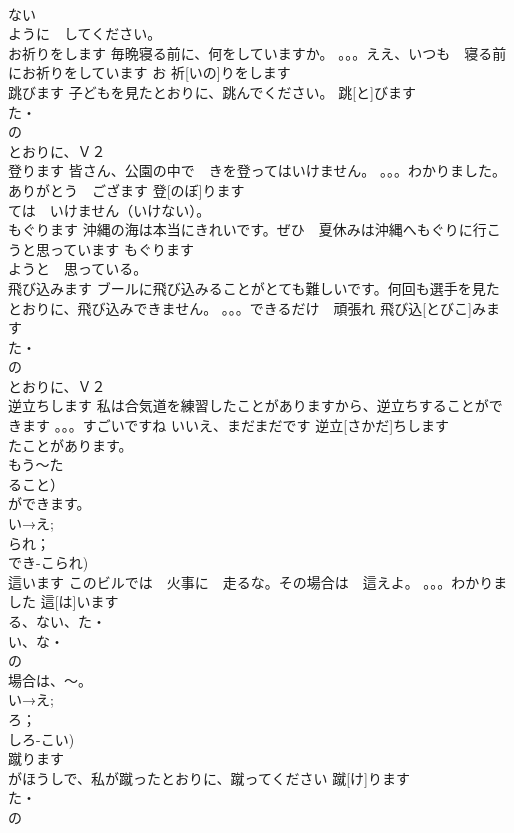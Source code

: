 \documentclass[8pt]{extreport}
\begin{document}
\begin{CJK}{UTF8}{min}
\\	ない
\\	ように　してください。
\\	お祈りをします	毎晩寝る前に、何をしていますか。 。。。ええ、いつも　寝る前にお祈りをしています	お 祈[いの]りをします			
\\	跳びます	子どもを見たとおりに、跳んでください。	跳[と]びます			
\\	た・
\\	の
\\	とおりに、Ｖ２
\\	登ります	皆さん、公園の中で　きを登ってはいけません。 。。。わかりました。ありがとう　ござます	登[のぼ]ります			
\\	ては　いけません（いけない）。
\\	もぐります	沖縄の海は本当にきれいです。ぜひ　夏休みは沖縄へもぐりに行こうと思っています	もぐります			
\\	ようと　思っている。
\\	飛び込みます	ブールに飛び込みることがとても難しいです。何回も選手を見たとおりに、飛び込みできません。 。。。できるだけ　頑張れ	飛び込[とびこ]みます			
\\	た・
\\	の
\\	とおりに、Ｖ２
\\	逆立ちします	私は合気道を練習したことがありますから、逆立ちすることができます 。。。すごいですね いいえ、まだまだです	逆立[さかだ]ちします			
\\	たことがあります。
\\	もう～た
\\	ること）　
\\	ができます。
\\	い→え;
\\	られ；
\\	でき-こられ)	
\\	這います	このビルでは　火事に　走るな。その場合は　這えよ。 。。。わかりました	這[は]います			
\\	る、ない、た・
\\	い、な・
\\	の
\\	場合は、～。
\\	い→え;
\\	ろ；
\\	しろ-こい)
\\	蹴ります	
\\	がほうしで、私が蹴ったとおりに、蹴ってください	蹴[け]ります			
\\	た・
\\	の

\end{CJK}
\end{document}
